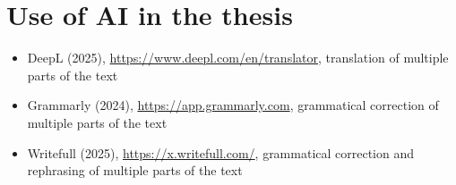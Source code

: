 \setcounter{figure}{0}
\setcounter{listing}{0}

\chapter{Use of AI in the thesis \label{cha:ai-use}}

\begin{itemize}
    \item DeepL (2025), \url{https://www.deepl.com/en/translator}, translation of multiple parts of the text
    \item Grammarly (2024), \url{https://app.grammarly.com}, grammatical correction of multiple parts of the text
    \item Writefull (2025), \url{https://x.writefull.com/}, grammatical correction and rephrasing of multiple parts of the text
\end{itemize}
